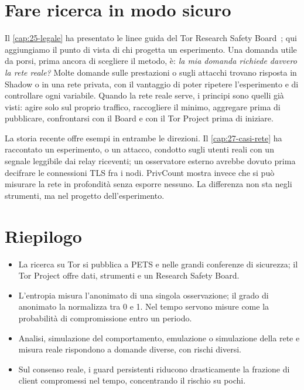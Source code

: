 \section{Fare ricerca in modo sicuro}\label{sec:ric-sicurezza}

Il \cref{cap:25-legale} ha presentato le linee guida del Tor Research Safety Board~\cite{trsb}; qui aggiungiamo il punto di vista di chi progetta un esperimento. Una domanda utile da porsi, prima ancora di scegliere il metodo, è: \emph{la mia domanda richiede davvero la rete reale?} Molte domande sulle prestazioni o sugli attacchi trovano risposta in Shadow o in una rete privata, con il vantaggio di poter ripetere l'esperimento e di controllare ogni variabile. Quando la rete reale serve, i principi sono quelli già visti: agire solo sul proprio traffico, raccogliere il minimo, aggregare prima di pubblicare, confrontarsi con il Board e con il Tor Project prima di iniziare.

La storia recente offre esempi in entrambe le direzioni. Il \cref{cap:27-casi-rete} ha raccontato un esperimento, o un attacco, condotto sugli utenti reali con un segnale leggibile dai relay riceventi; un osservatore esterno avrebbe dovuto prima decifrare le connessioni TLS fra i nodi. PrivCount mostra invece che si può misurare la rete in profondità senza esporre nessuno. La differenza non sta negli strumenti, ma nel progetto dell'esperimento.

\section*{Riepilogo}
\begin{itemize}
  \item La ricerca su Tor si pubblica a PETS e nelle grandi conferenze di sicurezza; il Tor Project offre dati, strumenti e un Research Safety Board.
  \item L'entropia misura l'anonimato di una singola osservazione; il grado di anonimato la normalizza tra 0 e 1. Nel tempo servono misure come la probabilità di compromissione entro un periodo.
  \item Analisi, simulazione del comportamento, emulazione o simulazione della rete e misura reale rispondono a domande diverse, con rischi diversi.
  \item Sul consenso reale, i guard persistenti riducono drasticamente la frazione di client compromessi nel tempo, concentrando il rischio su pochi.
\end{itemize}

